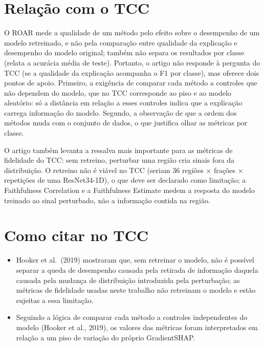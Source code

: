 \documentclass[11pt,a4paper]{article}
\begin{document}
\section{Relação com o TCC}
O ROAR mede a qualidade de um método pelo efeito sobre o desempenho de um modelo retreinado, e não pela comparação entre qualidade da explicação e desempenho do modelo original; também não separa os resultados por classe (relata a acurácia média de teste). Portanto, o artigo não responde à pergunta do TCC (se a qualidade da explicação acompanha o F1 por classe), mas oferece dois pontos de apoio. Primeiro, a exigência de comparar cada método a controles que não dependem do modelo, que no TCC corresponde ao piso e ao modelo aleatório: só a distância em relação a esses controles indica que a explicação carrega informação do modelo. Segundo, a observação de que a ordem dos métodos muda com o conjunto de dados, o que justifica olhar as métricas por classe.

O artigo também levanta a ressalva mais importante para as métricas de fidelidade do TCC: sem retreino, perturbar uma região cria sinais fora da distribuição. O retreino não é viável no TCC (seriam 36 regiões $\times$ frações $\times$ repetições de uma ResNet34-1D), o que deve ser declarado como limitação; a Faithfulness Correlation e a Faithfulness Estimate medem a resposta do modelo treinado ao sinal perturbado, não a informação contida na região.

\section{Como citar no TCC}
\begin{itemize}
  \item Hooker et al.\ (2019) mostraram que, sem retreinar o modelo, não é possível separar a queda de desempenho causada pela retirada de informação daquela causada pela mudança de distribuição introduzida pela perturbação; as métricas de fidelidade usadas neste trabalho não retreinam o modelo e estão sujeitas a essa limitação.
  \item Seguindo a lógica de comparar cada método a controles independentes do modelo (Hooker et al., 2019), os valores das métricas foram interpretados em relação a um piso de variação do próprio GradientSHAP.
\end{itemize}
\end{document}
